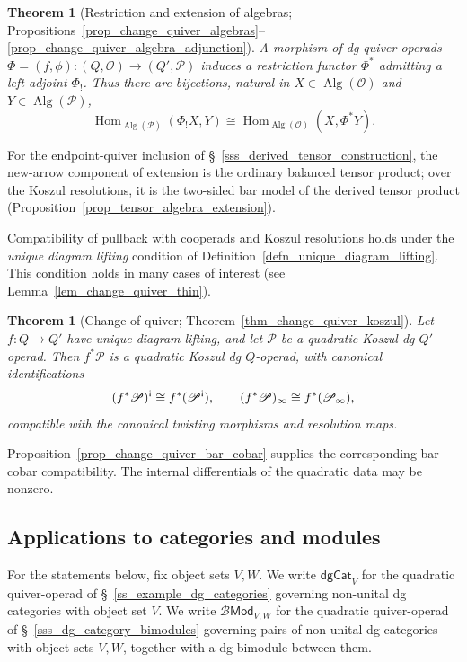 \documentclass[11pt,letterpaper]{article}
\numberwithin{equation}{section}
\theoremstyle{plain}
\newcounter{mainthm}
\newtheorem{main}[mainthm]{Theorem}
\theoremstyle{definition}
\theoremstyle{remark}
\newcommand{\antishriek}{%
	\mathord{\mathchoice
		{\rotatebox[origin=c]{180}{$\displaystyle !$}}
		{\rotatebox[origin=c]{180}{$\textstyle !$}}
		{\rotatebox[origin=c]{180}{$\scriptstyle !$}}
		{\rotatebox[origin=c]{180}{$\scriptscriptstyle !$}}}}
\begin{document}
\begin{main}[Restriction and extension of algebras;
Propositions~\ref{prop_change_quiver_algebras}--\ref{prop_change_quiver_algebra_adjunction}]
\label{thm_introduction_algebra_adjunction}
A morphism of dg quiver-operads
$
 \Phi=(f,\phi):(Q,\mathscr O)\longrightarrow(Q',\mathscr P)$
induces a restriction functor $\Phi^*$ admitting a left adjoint
$\Phi_!$. Thus there are bijections, natural in
$X\in\operatorname{Alg}(\mathscr O)$ and
$Y\in\operatorname{Alg}(\mathscr P)$,
\[
 \operatorname{Hom}_{\operatorname{Alg}(\mathscr P)}(\Phi_!X,Y)
 \cong
 \operatorname{Hom}_{\operatorname{Alg}(\mathscr O)}(X,\Phi^*Y).
\]
\end{main}
For the endpoint-quiver inclusion of \S~\ref{sss_derived_tensor_construction},
the new-arrow component of extension is the ordinary balanced tensor
product; over the Koszul resolutions, it is the two-sided bar model of the
derived tensor product (Proposition~\ref{prop_tensor_algebra_extension}).

Compatibility of pullback with cooperads and Koszul resolutions
holds under the \textit{unique
diagram lifting} condition of
Definition~\ref{defn_unique_diagram_lifting}. This condition holds
in many cases of interest (see
Lemma~\ref{lem_change_quiver_thin}).

\begin{main}[Change of quiver; Theorem~\ref{thm_change_quiver_koszul}]
\label{thm_introduction_change_quiver}
Let $f:Q\to Q'$ have unique diagram lifting, and let $\mathscr P$ be
a quadratic Koszul dg $Q'$-operad. Then $f^*\mathscr P$ is a
quadratic Koszul dg $Q$-operad, with canonical identifications
\[
 (f^*\mathscr P)^{\antishriek}
 \cong f^*(\mathscr P^{\antishriek}),
 \qquad
 (f^*\mathscr P)_\infty\cong f^*(\mathscr P_\infty),
\]
compatible with the canonical twisting morphisms and resolution maps.
\end{main}
Proposition~\ref{prop_change_quiver_bar_cobar} supplies
the corresponding bar--cobar compatibility. The internal differentials
of the quadratic data may be nonzero.

\subsection*{Applications to categories and modules}


For the statements below, fix object sets $V,W$. We write $\mathsf{dgCat}_V$ for the quadratic quiver-operad of \S~\ref{ss_example_dg_categories} governing non-unital dg categories with object set $V$. We write $\mathscr B\mathsf{Mod}_{V,W}$ for the quadratic quiver-operad of \S~\ref{sss_dg_category_bimodules} governing pairs of non-unital dg categories with object sets $V,W$, together with a dg bimodule between them.
\end{document}
